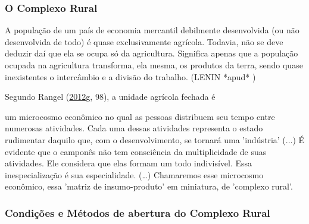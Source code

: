 \documentclass[
	12pt,				%
	oneside,			%
	a4paper,			%
	chapter=TITLE,		%
	section=TITLE,		%
	english,			%
	brazil				%
	]{abntex2}
\begin{document}
\hypertarget{o-complexo-rural}{%
\subsubsection{O Complexo Rural}\label{o-complexo-rural}}
\begin{citacao} 
A população de um país de economia mercantil debilmente desenvolvida (ou não 
desenvolvida de todo) é quase exclusivamente agrícola. Todavia, não se deve 
deduzir daí que ela se ocupa só da agricultura. Significa apenas que a população 
ocupada na agricultura transforma, ela mesma, os produtos da terra, sendo quase 
inexistentes o intercâmbio e a divisão do trabalho. 
(LENIN *apud* \cite[p. 99]{rangel1954}) 
\end{citacao}
Segundo Rangel (\protect\hyperlink{ref-rangel1956}{2012}\protect\hyperlink{ref-rangel1956}{g}, 98), a unidade agrícola fechada é
\begin{citacao}
um microcosmo econômico no qual as pessoas distribuem seu tempo entre numerosas
atividades. Cada uma dessas atividades representa o estado rudimentar daquilo
que, com o desenvolvimento, se tornará uma 'indústria' (...) É evidente que o
camponês não tem consciência da multiplicidade de suas atividades. Ele considera
que elas formam um todo indivisível. Essa inespecialização é sua especialidade.
(\ldots) Chamaremos esse microcosmo econômico, essa 'matriz de insumo-produto' em
miniatura, de 'complexo rural'.
\end{citacao}
\hypertarget{condiuxe7uxf5es-e-muxe9todos-de-abertura-do-complexo-rural}{%
\subsubsection{Condições e Métodos de abertura do Complexo Rural}\label{condiuxe7uxf5es-e-muxe9todos-de-abertura-do-complexo-rural}}
\end{document}
